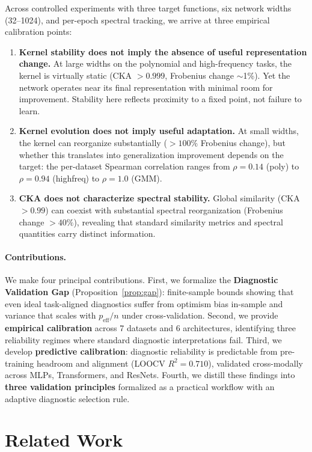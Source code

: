 \documentclass[twoside,11pt]{article}
\begin{document}
Across controlled experiments with three target functions, six network widths (32--1024), and per-epoch spectral tracking, we arrive at three empirical calibration points:

\begin{enumerate}
    \item \textbf{Kernel stability does not imply the absence of useful representation change.} At large widths on the polynomial and high-frequency tasks, the kernel is virtually static (CKA $>0.999$, Frobenius change $\sim$1\%). Yet the network operates near its final representation with minimal room for improvement. Stability here reflects proximity to a fixed point, not failure to learn.
    \item \textbf{Kernel evolution does not imply useful adaptation.} At small widths, the kernel can reorganize substantially ($>100\%$ Frobenius change), but whether this translates into generalization improvement depends on the target: the per-dataset Spearman correlation ranges from $\rho=0.14$ (poly) to $\rho=0.94$ (highfreq) to $\rho=1.0$ (GMM).
    \item \textbf{CKA does not characterize spectral stability.} Global similarity (CKA $>0.99$) can coexist with substantial spectral reorganization (Frobenius change $>40\%$), revealing that standard similarity metrics and spectral quantities carry distinct information.
\end{enumerate}

\paragraph{Contributions.}
We make four principal contributions. First, we formalize the \textbf{Diagnostic Validation Gap} (Proposition~\ref{prop:gap}): finite-sample bounds showing that even ideal task-aligned diagnostics suffer from optimism bias in-sample and variance that scales with $p_{\text{eff}}/n$ under cross-validation. Second, we provide \textbf{empirical calibration} across 7 datasets and 6 architectures, identifying three reliability regimes where standard diagnostic interpretations fail. Third, we develop \textbf{predictive calibration}: diagnostic reliability is predictable from pre-training headroom and alignment (LOOCV $R^2=0.710$), validated cross-modally across MLPs, Transformers, and ResNets. Fourth, we distill these findings into \textbf{three validation principles} formalized as a practical workflow with an adaptive diagnostic selection rule.

\section{Related Work}
\label{sec:related}
\end{document}
